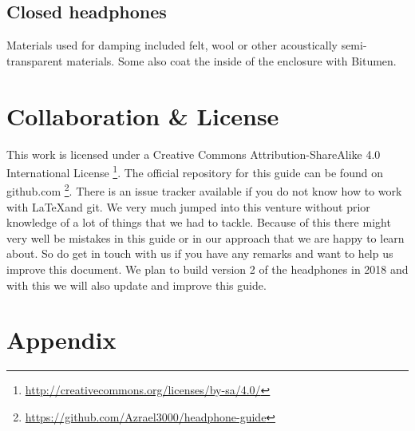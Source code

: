 \documentclass{article}
\begin{document}
\subsection{Closed headphones}
\label{s:future:closed}

Materials used for damping included felt, wool or other acoustically semi-transparent materials. Some also coat the inside of the enclosure with Bitumen.

\section{Collaboration \& License}
This work is licensed under a Creative Commons Attribution-ShareAlike 4.0 International License \footnote{\url{http://creativecommons.org/licenses/by-sa/4.0/}}. The official repository for this guide can be found on github.com \footnote{\url{https://github.com/Azrael3000/headphone-guide}}. There is an issue tracker available if you do not know how to work with \LaTeX and git. We very much jumped into this venture without prior knowledge of a lot of things that we had to tackle. Because of this there might very well be mistakes in this guide or in our approach that we are happy to learn about. So do get in touch with us if you have any remarks and want to help us improve this document. We plan to build version 2 of the headphones in 2018 and with this we will also update and improve this guide.

\section{Appendix}
\label{s:app}
\end{document}
